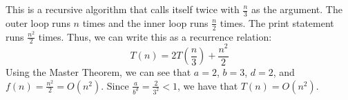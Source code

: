 \documentclass[12pt]{exam}
\begin{document}
\begin{solution}
	This is a recursive algorithm that calls itself twice with $\frac{n}{3}$ as the argument.
	The outer loop runs $n$ times and the inner loop runs $\frac{n}{2}$ times.
	The print statement runs $\frac{n^2}{2}$ times.
	Thus, we can write this as a recurrence relation:
	\[T(n) = 2T\left(\frac{n}{3}\right) + \frac{n^2}{2}\]
	Using the Master Theorem, we can see that $a = 2$, $b = 3$, $d=2$, and $f(n) = \frac{n^2}{2} = O(n^2)$.
	Since $\frac{a}{b^d} = \frac{2}{3^2} < 1$, we have that $T(n) = O(n^2)$.
\end{solution}
\end{document}

